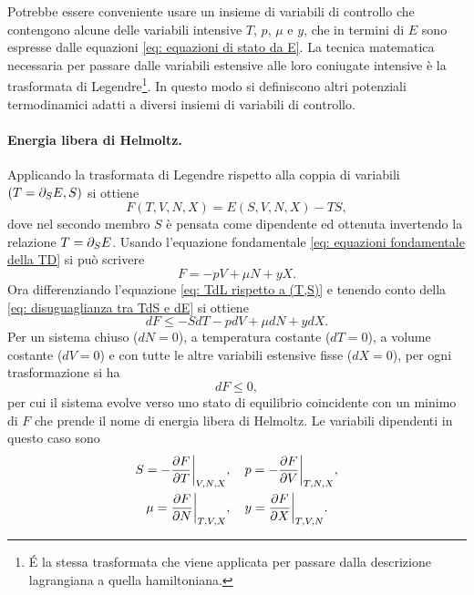 Potrebbe essere conveniente usare un insieme di variabili di controllo che contengono alcune delle variabili intensive $T$, $p$, $\mu$ e $y$, che in termini di $E$ sono espresse dalle equazioni \eqref{eq: equazioni di stato da E}. La tecnica matematica necessaria per passare dalle variabili estensive alle loro coniugate intensive è la trasformata di Legendre\footnote{\'E la stessa trasformata che viene applicata per passare dalla descrizione lagrangiana a quella hamiltoniana.}. In questo modo si definiscono altri potenziali termodinamici adatti a diversi insiemi di variabili di controllo. 

\paragraph{Energia libera di Helmoltz.} Applicando la trasformata di Legendre rispetto alla coppia di variabili $(T=\partial_S E,S)$ si ottiene
\begin{equation}
\label{eq: TdL rispetto a (T,S)}
    F(T,V,N,X) = E(S,V,N,X) - TS,
\end{equation}
dove nel secondo membro $S$ è pensata come dipendente ed ottenuta invertendo la relazione $T=\partial_S E$. Usando l'equazione fondamentale \eqref{eq: equazioni fondamentale della TD} si può scrivere
\begin{equation}
\label{eq: espressione di F}
    F = -pV + \mu N + yX.
\end{equation}
Ora differenziando l'equazione \eqref{eq: TdL rispetto a (T,S)} e tenendo conto della \eqref{eq: disuguaglianza tra TdS e dE} si ottiene
\begin{equation}
    dF \le -SdT -pdV + \mu dN + ydX.
\end{equation}
Per un sistema chiuso ($dN = 0$), a temperatura costante ($dT = 0$), a volume costante ($dV = 0$) e con tutte le altre variabili estensive fisse ($dX = 0$), per ogni trasformazione si ha
\begin{equation}
    dF \le 0,
\end{equation}
per cui il sistema evolve verso uno stato di equilibrio coincidente con un minimo di $F$ che prende il nome di energia libera di Helmoltz. Le variabili dipendenti in questo caso sono 
\begin{equation}
\label{eq: equazioni di stato da F}
    \begin{split}
        S = -\frac{\partial F}{\partial T}\bigg|_{V,N,X}&,\quad p = -\frac{\partial F}{\partial V}\bigg|_{T,N,X}, \\
        \mu = \frac{\partial F}{\partial N}\bigg|_{T,V,X}&,\quad y = \frac{\partial F}{\partial X}\bigg|_{T,V,N}.
    \end{split}
\end{equation}
